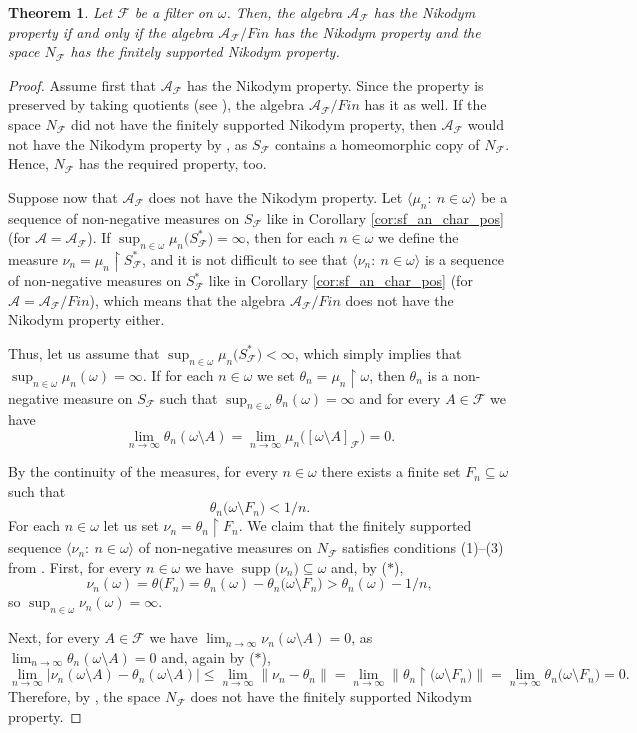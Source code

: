 \documentclass[a4paper,11pt,fleqn]{amsart}
\newtheorem{theorem}{Theorem}[section]
\theoremstyle{definition}
\theoremstyle{remark}
\numberwithin{equation}{section}
\newcommand{\N}{\mathbb{N}}
\newcommand{\aA}{\mathcal{A}}
\newcommand{\fF}{\mathcal{F}}
\newcommand{\rstr}{\restriction}
\newcommand{\sm}{\setminus}
\newcommand{\sub}{\subseteq}
\DeclareMathOperator{\supp}{supp}
\newcommand{\seqn}[1]{\big\langle#1\colon\ n\io\big\rangle}
\newcommand{\clopen}[1]{\left[#1\right]}
\newcommand{\io}{\in\omega}%
\begin{document}
\begin{theorem}\label{thm:sf_nik_nf_sfs}
Let $\fF$ be a filter on $\omega$. Then, the algebra $\aA_{\fF}$ has the Nikodym property if and only if the algebra $\aA_{\fF}/Fin$ has the Nikodym property and the space $N_{\fF}$ has the finitely supported Nikodym property.
\end{theorem}
\begin{proof}
Assume first that $\aA_\fF$ has the Nikodym property. Since the property is preserved by taking quotients (see \cite[Proposition 2.11.(b)]{Sch82}), the algebra $\aA_\fF/Fin$ has it as well. If the space $N_{\fF}$ did not have the finitely supported Nikodym property, then $\aA_{\fF}$ would not have the Nikodym property by \cite[Theorem 8.2]{Zuc25}, as $S_{\fF}$ contains a homeomorphic copy of $N_{\fF}$. Hence, $N_\fF$ has the required property, too.

Suppose now that $\aA_{\fF}$ does not have the Nikodym property. Let $\seqn{\mu_n}$ be a sequence of non-negative measures on $S_{\fF}$ like in Corollary \ref{cor:sf_an_char_pos} (for $\aA=\aA_\fF$). If $\sup_{n\io} \mu_n\big(S_{\fF}^*\big)=\infty$, then for each $n\io$ we define the measure $\nu_n=\mu_n\rstr S_{\fF}^*$, and it is not difficult to see that $\seqn{\nu_n}$ is a sequence of non-negative measures on $S_{\fF}^*$ like in Corollary \ref{cor:sf_an_char_pos} (for $\aA=\aA_\fF/Fin$), which means that the algebra $\aA_\fF/Fin$ does not have the Nikodym property either.

Thus, let us assume that $\sup_{n\io} \mu_n\big(S_{\fF}^*\big)<\infty$, which simply implies that $\sup_{n\io} \mu_n(\omega)=\infty$.
If for each $n\io$ we set $\theta_n=\mu_n\rstr\omega$, then $\theta_n$ is a non-negative measure on $S_{\fF}$ such that %
$\sup_{n\io}\theta_n(\omega)=\infty$ and for every $A\in\fF$ we have
\[\lim_{n\to\infty}\theta_n(\omega\sm A)=\lim_{n\to\infty}\mu_n\big(\clopen{\omega\sm A}_{\fF}\big)=0.\]

By the continuity of the measures, for every $n\io$ there exists a finite set $F_n\sub\omega$ such that
\[\tag{$*$}\theta_n\big(\omega\sm F_n\big) < 1/n.\]
For each $n\io$ let us set $\nu_n=\theta_n\rstr F_n$. We claim that the finitely supported sequence $\seqn{\nu_n}$ of non-negative measures on $N_\fF$ satisfies conditions (1)--(3) from \cite[Theorem 4.1]{Zuc25}. First, for every $n\io$ we have $\supp\big(\nu_n\big)\sub\omega$ and, by ($*$),
\[\nu_n(\omega) = \theta\big(F_n\big)= \theta_n(\omega) - \theta_n\big(\omega\sm F_n\big) > \theta_n(\omega) - 1/n,\]
so $\sup_{n\io}\nu_n(\omega)=\infty$.

Next, for every $A\in\fF$ we have $\lim_{n\to\infty}\nu_n(\omega\sm A)=0$, as $\lim_{n\to\infty}\theta_n(\omega\sm A)=0$ and, again by ($*$),
\[\lim_{n\to\infty}\big|\nu_n(\omega\sm A) - \theta_n(\omega\sm A)\big|\leq\lim_{n\to\infty}\big\|\nu_n - \theta_n\big\|=\lim_{n\to\infty}\big\|\theta_n\rstr \big(\omega\sm F_n\big)\big\|=\lim_{n\to\infty}\theta_n\big(\omega\sm F_n\big)=0. \]
Therefore, by \cite[Theorem 4.1]{Zuc25}, the space $N_{\fF}$ does not have the finitely supported Nikodym property.
\end{proof}
\end{document}
